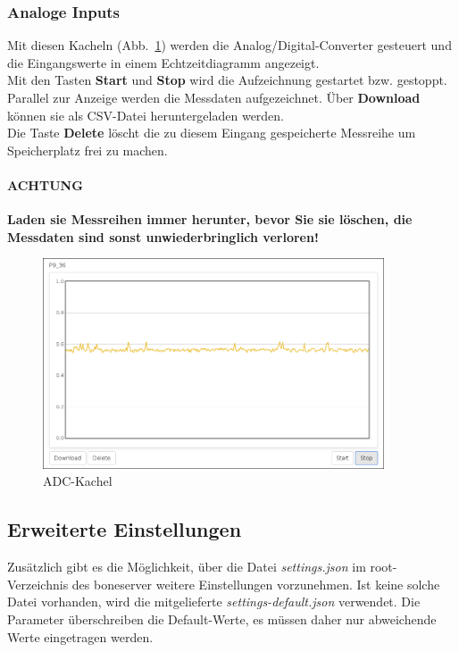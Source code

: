 \subsubsection{Analoge Inputs}
Mit diesen Kacheln \mbox{(Abb. \ref{fig:mainWindowADC})} werden die Analog/Digital-Converter gesteuert und die Eingangswerte in einem Echtzeitdiagramm angezeigt.\\

Mit den Tasten \textbf{Start} und \textbf{Stop} wird die Aufzeichnung gestartet bzw. gestoppt. Parallel zur Anzeige werden die Messdaten aufgezeichnet. Über \textbf{Download} können sie als CSV-Datei heruntergeladen werden.\\

Die Taste \textbf{Delete} löscht die zu diesem Eingang gespeicherte Messreihe um Speicherplatz frei zu machen.

\paragraph{\color{red} ACHTUNG} \textbf{\color{red} Laden sie Messreihen immer herunter, bevor Sie sie löschen, die Messdaten sind sonst unwiederbringlich verloren!}

\begin{figure}[ht] 
	\centering
	\includegraphics[width=0.9\textwidth]{betriebsanleitung/images/mainWindowAIN.png}
	\caption{ADC-Kachel}
	\label{fig:mainWindowADC}
\end{figure}


\subsection{Erweiterte Einstellungen}
Zusätzlich gibt es die Möglichkeit, über die Datei \textit{settings.json} im root-Verzeichnis des boneserver weitere Einstellungen vorzunehmen. Ist keine solche Datei vorhanden, wird die mitgelieferte \textit{settings-default.json} verwendet. Die Parameter überschreiben die Default-Werte, es müssen daher nur abweichende Werte eingetragen werden.\\

